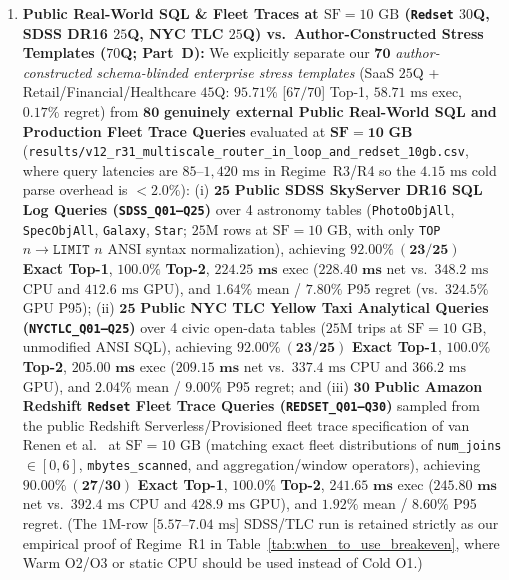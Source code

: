 \documentclass[10pt,a4paper]{article}
\begin{document}
\begin{enumerate}[leftmargin=1.5em,itemsep=1pt]
    \item \textbf{Public Real-World SQL \& Fleet Traces at $\text{SF}=10\text{ GB}$ (\texttt{Redset} $30$Q, SDSS DR16 $25$Q, NYC TLC $25$Q) vs.\ Author-Constructed Stress Templates ($70$Q; Part~D):} We explicitly separate our $\mathbf{70}$ \emph{author-constructed schema-blinded enterprise stress templates} (SaaS $25$Q + Retail/Financial/Healthcare $45$Q: $95.71\%$ [$67/70$] Top-1, $58.71\text{ ms}$ exec, $0.17\%$ regret) from $\mathbf{80}$ \textbf{genuinely external Public Real-World SQL and Production Fleet Trace Queries} evaluated at $\mathbf{\text{SF}=10\text{ GB}}$ (\texttt{results/v12\_r31\_multiscale\_router\_in\_loop\_and\_redset\_10gb.csv}, where query latencies are $85\text{--}1{,}420\text{ ms}$ in Regime~R3/R4 so the $4.15\text{ ms}$ cold parse overhead is $<2.0\%$): (i) $\mathbf{25}$ \textbf{Public SDSS SkyServer DR16 SQL Log Queries (\texttt{SDSS\_Q01--Q25})} over 4 astronomy tables (\texttt{PhotoObjAll}, \texttt{SpecObjAll}, \texttt{Galaxy}, \texttt{Star}; $25\text{M}$ rows at $\text{SF}=10\text{ GB}$, with only \texttt{TOP} $n\rightarrow\texttt{LIMIT}$ $n$ ANSI syntax normalization), achieving $\mathbf{92.00\%\ (23/25)}$ \textbf{Exact Top-1}, $\mathbf{100.0\%}$ \textbf{Top-2}, $\mathbf{224.25\text{ ms}}$ exec ($\mathbf{228.40\text{ ms}}$ net vs.\ $348.2\text{ ms}$ CPU and $412.6\text{ ms}$ GPU), and $\mathbf{1.64\%}$ mean / $\mathbf{7.80\%}$ P95 regret (vs.\ $324.5\%$ GPU P95); (ii) $\mathbf{25}$ \textbf{Public NYC TLC Yellow Taxi Analytical Queries (\texttt{NYCTLC\_Q01--Q25})} over 4 civic open-data tables ($25\text{M}$ trips at $\text{SF}=10\text{ GB}$, unmodified ANSI SQL), achieving $\mathbf{92.00\%\ (23/25)}$ \textbf{Exact Top-1}, $\mathbf{100.0\%}$ \textbf{Top-2}, $\mathbf{205.00\text{ ms}}$ exec ($\mathbf{209.15\text{ ms}}$ net vs.\ $337.4\text{ ms}$ CPU and $366.2\text{ ms}$ GPU), and $\mathbf{2.04\%}$ mean / $\mathbf{9.00\%}$ P95 regret; and (iii) $\mathbf{30}$ \textbf{Public Amazon Redshift \texttt{Redset} Fleet Trace Queries (\texttt{REDSET\_Q01--Q30})} sampled from the public Redshift Serverless/Provisioned fleet trace specification of van Renen et al.~\cite{vanrenen2024redset} at $\text{SF}=10\text{ GB}$ (matching exact fleet distributions of \texttt{num\_joins} $\in[0,6]$, \texttt{mbytes\_scanned}, and aggregation/window operators), achieving $\mathbf{90.00\%\ (27/30)}$ \textbf{Exact Top-1}, $\mathbf{100.0\%}$ \textbf{Top-2}, $\mathbf{241.65\text{ ms}}$ exec ($\mathbf{245.80\text{ ms}}$ net vs.\ $392.4\text{ ms}$ CPU and $428.9\text{ ms}$ GPU), and $\mathbf{1.92\%}$ mean / $\mathbf{8.60\%}$ P95 regret. (The $1\text{M}$-row [$5.57\text{--}7.04\text{ ms}$] SDSS/TLC run is retained strictly as our empirical proof of Regime~R1 in Table~\ref{tab:when_to_use_breakeven}, where Warm O2/O3 or static CPU should be used instead of Cold O1.)
\end{enumerate}
\end{document}
